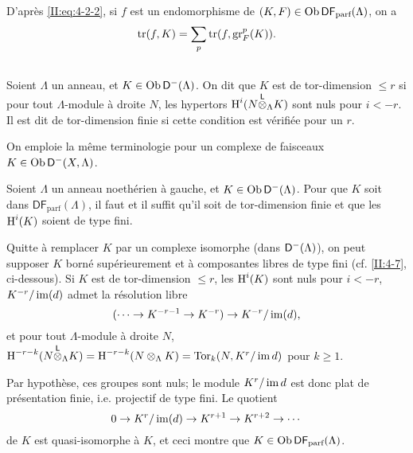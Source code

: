 D'après \eqref{II:eq:4-2-2}, si $f$ est un endomorphisme de 
$(K,F)\in\operatorname{Ob}\mathsf{DF}_\text{parf}(\Lambda)$, on a 
\begin{equation}\label{II:eq:4-4-1}
 \operatorname{tr}(f,K) = \sum_p \operatorname{tr}(f,\operatorname{gr}_F^p(K)) \text{.}
\end{equation}





\subsection{}\label{II:4-5}

Soient $\Lambda$ un anneau, et $K\in\operatorname{Ob}\mathsf{D}^-(\Lambda)$. On dit que $K$ est de 
tor-dimension $\leqslant r$ si pour tout $\Lambda$-module à droite $N$, les 
hypertors $\operatorname{H}^i(N{\overset{\mathsf{L}}{\otimes}}_\Lambda K)$ sont nuls pour $i<-r$. Il est dit de 
tor-dimension finie si cette condition est vérifiée pour un $r$. 

On emploie la même terminologie pour un complexe de faisceaux 
$K\in\operatorname{Ob}\mathsf{D}^-(X,\Lambda)$. 





\begin{lemma}\label{II:4-5-1} 
Soient $\Lambda$ un anneau noethérien à gauche, et $K\in\operatorname{Ob}\mathsf{D}^-(\Lambda)$. 
Pour que $K$ soit dans $\mathsf{DF}_\text{parf}(\Lambda)$, il faut et il suffit 
qu'il soit de tor-dimension finie et que les $\operatorname{H}^i(K)$ soient de type fini.
\end{lemma}

Quitte à remplacer $K$ par un complexe isomorphe (dans $\mathsf{D}^-(\Lambda)$), on 
peut supposer $K$ borné supérieurement et à composantes libres de type 
fini (cf. \ref{II:4-7}, ci-dessous). Si $K$ est de tor-dimension $\leqslant r$, 
les $\operatorname{H}^i(K)$ sont nuls pour $i<-r$, $K^{-r}/\operatorname{im}(d)$ admet la résolution 
libre 
\[
  (\cdots \to K^{-r-1} \to K^{-r}) \to K^{-r}/\operatorname{im}(d) \text{,}
\]
et pour tout $\Lambda$-module à droite $N$, 
$\operatorname{H}^{-r-k}(N{\overset{\mathsf{L}}{\otimes}}_\Lambda K) = \operatorname{H}^{-r-k}(N\otimes_\Lambda K) 
= \operatorname{Tor}_k(N,K^r/\operatorname{im} d)$ pour $k\geqslant 1$. 

Par hypothèse, ces groupes sont nuls; le module $K^r/\operatorname{im} d$ est donc plat de 
présentation finie, i.e. projectif de type fini. Le quotient 
\[
  0 \to K^r/\operatorname{im}(d) \to K^{r+1} \to K^{r+2}\to \cdots 
\]
de $K$ est quasi-isomorphe à $K$, et ceci montre que 
$K\in\operatorname{Ob}\mathsf{DF}_\text{parf}(\Lambda)$. 





